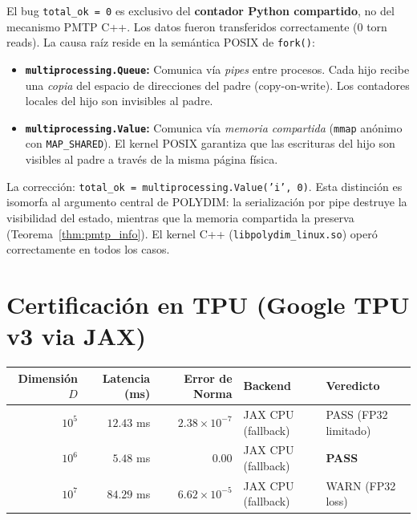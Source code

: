 \begin{remark}

El bug \texttt{total\_ok = 0} es exclusivo del \textbf{contador Python compartido},
no del mecanismo PMTP C++. Los datos fueron transferidos correctamente (0 torn reads).
La causa raíz reside en la semántica POSIX de \texttt{fork()}:

\begin{itemize}
    \item \textbf{\texttt{multiprocessing.Queue}:} Comunica vía \emph{pipes} entre 
    procesos. Cada hijo recibe una \emph{copia} del espacio de direcciones del padre 
    (copy-on-write). Los contadores locales del hijo son invisibles al padre.
    
    \item \textbf{\texttt{multiprocessing.Value}:} Comunica vía \emph{memoria compartida}
    (\texttt{mmap} anónimo con \texttt{MAP\_SHARED}). El kernel POSIX garantiza que las
    escrituras del hijo son visibles al padre a través de la misma página física.
\end{itemize}

La corrección: \texttt{total\_ok = multiprocessing.Value('i', 0)}. Esta distinción
es isomorfa al argumento central de POLYDIM: la serialización por pipe destruye
la visibilidad del estado, mientras que la memoria compartida la preserva
(Teorema~\ref{thm:pmtp_info}). El kernel C++ (\texttt{libpolydim\_linux.so}) operó
correctamente en todos los casos.
\end{remark}

\section{Certificación en TPU (Google TPU v3 via JAX)}


\centering


\begin{tabular}{@{}rrrll@{}}
\hline
Dimensión $D$ & Latencia (ms) & Error de Norma & Backend & Veredicto \\
\hline
$10^5$     & $12.43$ ms & $2.38 \times 10^{-7}$  & JAX CPU (fallback) & PASS (FP32 limitado) \\
$10^6$     & $5.48$ ms  & $0.00$                  & JAX CPU (fallback) & \textbf{PASS} \\
$10^7$     & $84.29$ ms & $6.62 \times 10^{-5}$   & JAX CPU (fallback) & WARN (FP32 loss) \\
\hline
\end{tabular}


